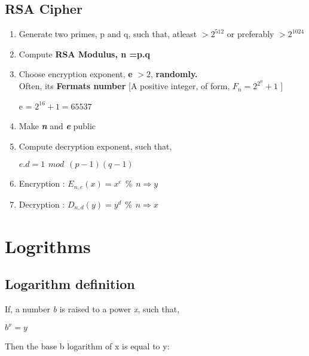 \documentclass[12pt]{article}
\begin{document}
\subsection{RSA Cipher}
\begin{enumerate}
\item Generate two primes, p and q, such that, atleast $>2^{512}$ or preferably $>2^{1024}$
\item Compute \textbf{RSA Modulus, n =p.q}
\item Choose encryption exponent, \textbf{e} $> 2$, \textbf{randomly.} \\
Often, its \textbf{Fermats number} [A positive integer, of form, \textbf{$F_{n}=2^{2^{n}} + 1$} ]\\
\begin{center}
e = $2^{16} +1 = 65537$
\end{center}
\item Make \textbf{\textit{n}} and \textbf{\textit{e}} public
\item Compute decryption exponent, such that,\\
\begin{center}
$e.d = 1 \hspace{5pt} mod \hspace{5pt} (p-1)(q-1)$
\end{center}
\item Encryption : $E_{n,e}(x) = x ^{e} \hspace{5pt} \% \hspace{5pt}n \Rightarrow y $
\item Decryption : $D_{n,d}(y) = y ^{d} \hspace{5pt} \% \hspace{5pt}n \Rightarrow x $
\end{enumerate}

\pagebreak
\section{Logrithms}
\subsection{Logarithm definition}

If, a number \textit{b} is raised to a power \textit{x}, such that,\\
\begin{center}	$b^{x} = y$		\end{center}

Then the base b logarithm of x is equal to y:
\end{document}
